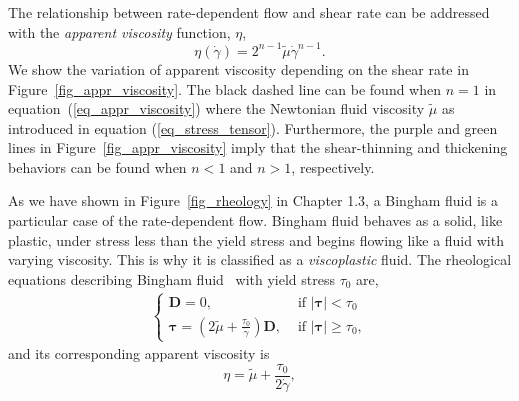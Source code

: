 \par
The relationship between rate-dependent flow and shear rate can be addressed with the \textit{apparent viscosity} function, $\eta$,
\begin{equation}
  \eta(\dot{\gamma})
    =2^{n-1} \tilde{\mu} \dot{\gamma} ^{n-1}.
  \label{eq_appr_viscosity}
\end{equation}
We show the variation of apparent viscosity depending on the shear rate in Figure~\ref{fig_appr_viscosity}.
The black dashed line can be found when $n = 1$ in equation~(\ref{eq_appr_viscosity}) where the Newtonian fluid viscosity $\tilde{\mu}$ as introduced in equation (\ref{eq_stress_tensor}). 
Furthermore, the purple and green lines in Figure~\ref{fig_appr_viscosity} imply that the shear-thinning and thickening behaviors can be found when $n < 1$ and $n>1$, respectively. 
\par
As we have shown in Figure~\ref{fig_rheology} in Chapter 1.3, a Bingham fluid is a particular case of the rate-dependent flow. 
Bingham fluid behaves as a solid, like plastic, under stress less than the yield stress and begins flowing like a fluid with varying viscosity. 
This is why it is classified as a \textit{viscoplastic} fluid.
The rheological equations describing Bingham fluid~\cite{bingham_investigation_1917} with yield stress $\tau_0$ are,
\begin{align}
  \left\{\begin{matrix}
 {\bm D} =0, & \text { if } |{\bm \tau} | <\tau_0 \\
  {\bm \tau}  = 
\left(2 \tilde{\mu} + \frac{\tau_0}{ \dot{\gamma}}\right) {\bm D} , & \text { if } |{\bm \tau}|\geq \tau_0,
\end{matrix}\right.
\label{eq_Bingham}
  \end{align}
and its corresponding apparent viscosity is
\begin{equation}
  \eta=\tilde{\mu} +\frac{\tau_0}{2 \dot{\gamma}},
  \end{equation}
